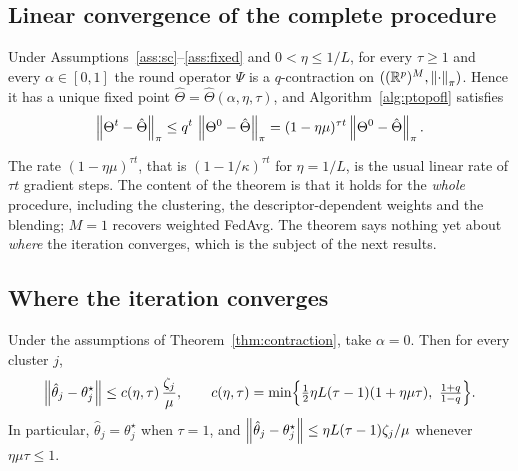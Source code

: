 \subsection{Linear convergence of the complete procedure}

\begin{theorem}[Contraction]\label{thm:contraction}
Under Assumptions~\ref{ass:sc}--\ref{ass:fixed} and $0<\eta\le1/L$, for every $\tau\ge1$ and
every $\alpha\in[0,1]$ the round operator $\Psi$ is a $q$-contraction on
$((\mathbb{R}^p)^M,\left\lVert \cdot \right\rVert_{\pi})$. Hence it has a unique fixed point
$\hat\Theta=\hat\Theta(\alpha,\eta,\tau)$, and Algorithm~\ref{alg:ptopofl} satisfies
\[
  \left\lVert \Theta^t-\hat\Theta \right\rVert_{\pi}\le q^t\,\left\lVert \Theta^0-\hat\Theta \right\rVert_{\pi}=(1-\eta\mu)^{\tau t}\left\lVert \Theta^0-\hat\Theta \right\rVert_{\pi}.
\]
\end{theorem}
The rate $(1-\eta\mu)^{\tau t}$, that is $(1-1/\kappa)^{\tau t}$ for $\eta=1/L$, is the
usual linear rate of $\tau t$ gradient steps. The content of the theorem is that it holds
for the \emph{whole} procedure, including the clustering, the descriptor-dependent weights
and the blending; $M=1$ recovers weighted FedAvg. The theorem says nothing yet about
\emph{where} the iteration converges, which is the subject of the next results.

\subsection{Where the iteration converges}

\begin{theorem}\label{thm:drift}
Under the assumptions of Theorem~\ref{thm:contraction}, take $\alpha=0$. Then for every
cluster $j$,
\[
  \norm{\hat\theta_j-\theta_j^\star}\le c(\eta,\tau)\,\frac{\zeta_j}{\mu},
  \qquad
  c(\eta,\tau)=\min\Bigl\{\tfrac{1}{2}\eta L(\tau-1)(1+\eta\mu\tau),\ \tfrac{1+q}{1-q}\Bigr\}.
\]
In particular, $\hat\theta_j=\theta_j^\star$ when $\tau=1$, and
$\left\lVert \hat\theta_j-\theta_j^\star \right\rVert\le\eta L(\tau-1)\zeta_j/\mu$ whenever $\eta\mu\tau\le1$.
\end{theorem}

